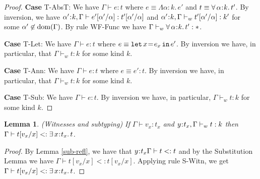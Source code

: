 \documentclass[11pt]{article}
\newtheorem{lemma}[theorem]{Lemma}
\newcommand{\al}{\alpha}
\newcommand{\bind}{\hspace{0.05em}{:}\hspace{0.05em}} %
\newcommand{\col}{\mathbin{:}}       %
\newcommand{\existype}[3]{\exists\, #1\bind #2.\, #3}
\newcommand{\polytype}[3]{\forall\, #1\bind #2.\, #3}
\newcommand{\letin}[3]{{\tt let}\,#1\hspace{0.1em}{=}\hspace{0.1em}#2\,{\tt in}\,#3}
\newcommand{\dom}[1]{{\rm dom}(#1)}
\begin{document}
\begin{proof}
{\bf Case} {\sc T-AbsT}: We have $\Gamma \vdash e : t$ where $e \equiv \Lambda \al:k.\, e'$ and $t \equiv \polytype{\al}{k}{t'}$. By inversion, we have $\al'\bind k,\Gamma \vdash e'[\al'/\al] : t'[\al'/\al]$ and $\al'\bind k,\Gamma \vdash_w t'[\al'/\al] : k'$ for some $\al'\not\in\dom{\Gamma}$. By rule {\sc WF-Func} we have $\Gamma \vdash_w \polytype{\al}{k}{t'} : *$.

{\bf Case} {\sc T-Let}: We have $\Gamma \vdash e : t$ where $e \equiv \letin{x}{e_x}{e'}$. By inversion we have, in particular, that $\Gamma \vdash_w t :k$ for some kind $k$.

{\bf Case} {\sc T-Ann}: We have $\Gamma \vdash e : t$ where $e \equiv e'\col t$. By inversion we have, in particular, that $\Gamma \vdash_w t : k$ for some kind $k$.

{\bf Case} {\sc T-Sub}: We have $\Gamma \vdash e : t$. By inversion we have, in particular, $\Gamma \vdash_w t : k$ for some kind $k$.
\end{proof} 

\begin{lemma}\label{witness-sub}
(Witnesses and subtyping) If $\Gamma \vdash v_x : t_x$ and $y\bind t_x,\Gamma \vdash_w t : k$ then $\Gamma \vdash t[v_x/x] <: \existype{x}{t_x}{t}$.
\end{lemma}
\begin{proof}
By Lemma \ref{sub-refl}, we have that $y\bind t_x \Gamma \vdash t <: t$ and by the Substitution Lemma we have $\Gamma \vdash t[v_x/x] <: t[v_x/x]$.  Applying rule {\sc S-Witn}, we get $\Gamma \vdash t[v_x/x] <: \existype{x}{t_x}{t}$.
\end{proof}
\end{document}
